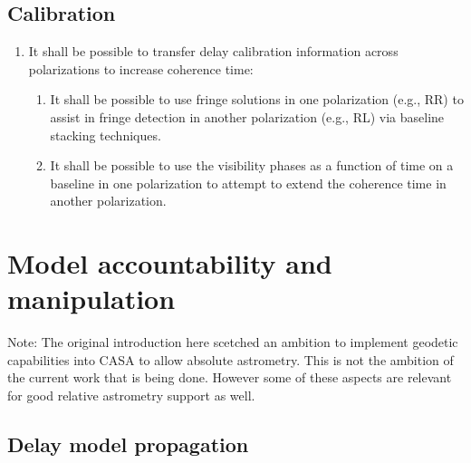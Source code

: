 \documentclass[11pt,a4paper]{article}
\begin{document}
\subsection{Calibration}

\begin{enumerate}[subseclist]

\item It shall be possible to transfer delay calibration information
  across polarizations to increase coherence time:

\begin{enumerate}[subsecsublist]

\item It shall be possible to use fringe solutions in one polarization
  (e.g., RR) to assist in fringe detection in another polarization
  (e.g., RL) via baseline stacking techniques.

\item It shall be possible to use the visibility phases as a function
  of time on a baseline in one polarization to attempt to extend the
  coherence time in another polarization.

\end{enumerate}

\end{enumerate}


\section{Model accountability and manipulation}

Note: The original introduction here scetched an ambition to implement
geodetic capabilities into CASA to allow absolute astrometry.  This is
not the ambition of the current work that is being done.  However some
of these aspects are relevant for good relative astrometry support as
well.

\subsection{Delay model propagation}
\end{document}
